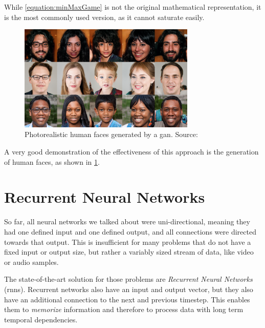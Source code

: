 While \cref{equation:minMaxGame} is not the original mathematical representation, it is the most commonly used version, as it cannot saturate easily.


\begin{figure}
  \centering
  \includegraphics[width=0.75\textwidth]{../assets/background/stylegan-teaser.png}
  \caption[Photorealistic human faces generated by a \gls{gan}]{Photorealistic human faces generated by a \gls{gan}. Source:~\cite{styleGan}}
  \label{fig:ganFaces}
\end{figure}

A very good demonstration of the effectiveness of this approach is the generation of human faces, as shown in \cref{fig:ganFaces}.

\section{Recurrent Neural Networks}

So far, all neural networks we talked about were uni-directional, meaning they had one defined input and one defined output, and all connections were directed towards that output. This is insufficient for many problems that do not have a fixed input or output size, but rather a variably sized stream of data, like video or audio samples.

The state-of-the-art solution for those problems are \emph{Recurrent Neural Networks} (\glspl{rnn}). Recurrent networks also have an input and output vector, but they also have an additional connection to the next and previous timestep. This enables them to \emph{memorize} information and therefore to process data with long term temporal dependencies.


